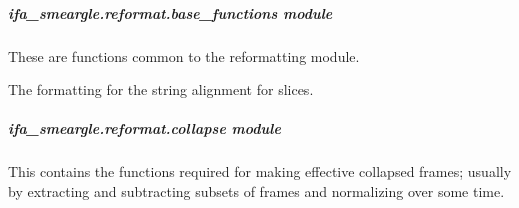 \documentclass[letterpaper,10pt,english]{sphinxmanual}
\begin{document}
\subparagraph{ifa\_smeargle.reformat.base\_functions module}
\label{\detokenize{docstrings/ifa_smeargle.reformat.base_functions:module-ifa_smeargle.reformat.base_functions}}\label{\detokenize{docstrings/ifa_smeargle.reformat.base_functions:ifa-smeargle-reformat-base-functions-module}}\label{\detokenize{docstrings/ifa_smeargle.reformat.base_functions::doc}}
These are functions common to the reformatting module.

\begin{fulllineitems}
\label{\detokenize{docstrings/ifa_smeargle.reformat.base_functions:ifa_smeargle.reformat.base_functions.format_slice_appending_name}}
The formatting for the string alignment for slices.

\end{fulllineitems}



\subparagraph{ifa\_smeargle.reformat.collapse module}
\label{\detokenize{docstrings/ifa_smeargle.reformat.collapse:module-ifa_smeargle.reformat.collapse}}\label{\detokenize{docstrings/ifa_smeargle.reformat.collapse:ifa-smeargle-reformat-collapse-module}}\label{\detokenize{docstrings/ifa_smeargle.reformat.collapse::doc}}
This contains the functions required for making effective collapsed
frames; usually by extracting and subtracting subsets of frames and
normalizing over some time.
\end{document}

